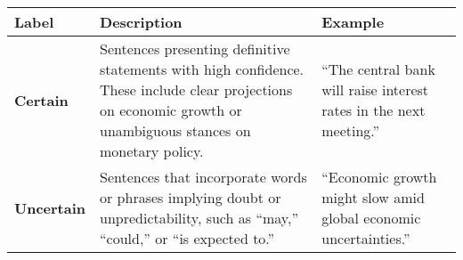 \begin{table*}
    \caption{}
    \vspace{1em}
    \begin{tabular}{p{}p{}p{}}
    \toprule
    \textbf{Label} & \textbf{Description} & \textbf{Example} \\
    \midrule
    \textbf{Certain} & Sentences presenting definitive statements with high confidence. These include clear projections on economic growth or unambiguous stances on monetary policy. & ``The central bank will raise interest rates in the next meeting.'' \\
    \midrule
    \textbf{Uncertain} & Sentences that incorporate words or phrases implying doubt or unpredictability, such as “may,” “could,” or “is expected to.” & ``Economic growth might slow amid global economic uncertainties.'' \\
    \bottomrule
    \end{tabular}
    \label{tb:bot_certainty_guide}
    \end{table*}